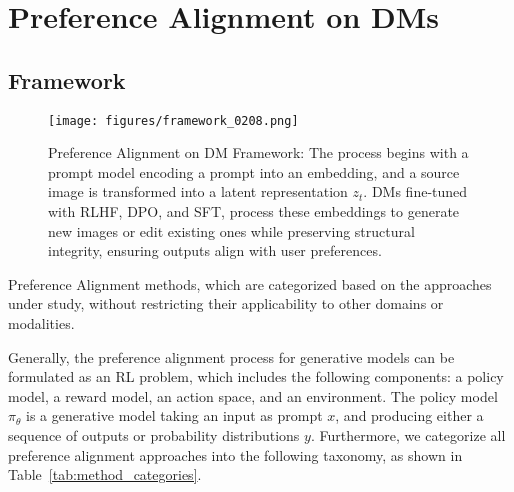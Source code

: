 \section{Preference Alignment on DMs}
\label{sec:preference_fine_tuning_on_t2i}
\subsection{Framework}

\begin{figure*}[th!]
    \centering
    \texttt{[image: figures/framework\_0208.png]}
    \caption{Preference Alignment on DM Framework: The process begins with a prompt model encoding a prompt into an embedding, and a source image is transformed into a latent representation $z_t$. DMs fine-tuned with RLHF, DPO, and SFT, process these embeddings to generate new images or edit existing ones while preserving structural integrity, ensuring outputs align with user preferences.}
    \label{fig:total_framework}
\end{figure*}

\begin{table*}[th!]
\centering
\resizebox{1\linewidth}{!}
{}
\caption{Preference Alignment methods, which are categorized based on the approaches under study, without restricting their applicability to other domains or modalities.}
\label{tab:method_categories}
\end{table*}

Generally, the preference alignment process for generative models can be formulated as an RL problem, which includes the following components: a policy model, a reward model, an action space, and an environment. The policy model $\pi_\theta$ is a generative model taking an input as prompt $x$, and producing either a sequence of outputs or probability distributions $y$. Furthermore, we categorize all preference alignment approaches into the following taxonomy, as shown in Table~\ref{tab:method_categories}.


